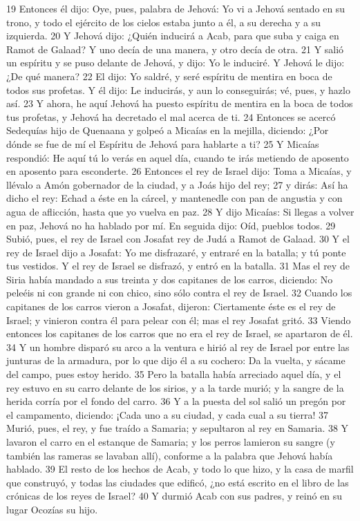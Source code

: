 19 Entonces él dijo: Oye, pues, palabra de Jehová: Yo vi a Jehová sentado en su trono, y todo el ejército de los cielos estaba junto a él, a su derecha y a su izquierda.
20 Y Jehová dijo: ¿Quién inducirá a Acab, para que suba y caiga en Ramot de Galaad? Y uno decía de una manera, y otro decía de otra.
21 Y salió un espíritu y se puso delante de Jehová, y dijo: Yo le induciré. Y Jehová le dijo: ¿De qué manera?
22 El dijo: Yo saldré, y seré espíritu de mentira en boca de todos sus profetas. Y él dijo: Le inducirás, y aun lo conseguirás; vé, pues, y hazlo así.
23 Y ahora, he aquí Jehová ha puesto espíritu de mentira en la boca de todos tus profetas, y Jehová ha decretado el mal acerca de ti.
24 Entonces se acercó Sedequías hijo de Quenaana y golpeó a Micaías en la mejilla, diciendo: ¿Por dónde se fue de mí el Espíritu de Jehová para hablarte a ti?
25 Y Micaías respondió: He aquí tú lo verás en aquel día, cuando te irás metiendo de aposento en aposento para esconderte.
26 Entonces el rey de Israel dijo: Toma a Micaías, y llévalo a Amón gobernador de la ciudad, y a Joás hijo del rey;
27 y dirás: Así ha dicho el rey: Echad a éste en la cárcel, y mantenedle con pan de angustia y con agua de aflicción, hasta que yo vuelva en paz.
28 Y dijo Micaías: Si llegas a volver en paz, Jehová no ha hablado por mí. En seguida dijo: Oíd, pueblos todos.
29 Subió, pues, el rey de Israel con Josafat rey de Judá a Ramot de Galaad.
30 Y el rey de Israel dijo a Josafat: Yo me disfrazaré, y entraré en la batalla; y tú ponte tus vestidos. Y el rey de Israel se disfrazó, y entró en la batalla.
31 Mas el rey de Siria había mandado a sus treinta y dos capitanes de los carros, diciendo: No peleéis ni con grande ni con chico, sino sólo contra el rey de Israel.
32 Cuando los capitanes de los carros vieron a Josafat, dijeron: Ciertamente éste es el rey de Israel; y vinieron contra él para pelear con él; mas el rey Josafat gritó.
33 Viendo entonces los capitanes de los carros que no era el rey de Israel, se apartaron de él.
34 Y un hombre disparó su arco a la ventura e hirió al rey de Israel por entre las junturas de la armadura, por lo que dijo él a su cochero: Da la vuelta, y sácame del campo, pues estoy herido.
35 Pero la batalla había arreciado aquel día, y el rey estuvo en su carro delante de los sirios, y a la tarde murió; y la sangre de la herida corría por el fondo del carro.
36 Y a la puesta del sol salió un pregón por el campamento, diciendo: ¡Cada uno a su ciudad, y cada cual a su tierra!
37 Murió, pues, el rey, y fue traído a Samaria; y sepultaron al rey en Samaria.
38 Y lavaron el carro en el estanque de Samaria; y los perros lamieron su sangre (y también las rameras se lavaban allí), conforme a la palabra que Jehová había hablado.
39 El resto de los hechos de Acab, y todo lo que hizo, y la casa de marfil que construyó, y todas las ciudades que edificó, ¿no está escrito en el libro de las crónicas de los reyes de Israel?
40 Y durmió Acab con sus padres, y reinó en su lugar Ocozías su hijo.


